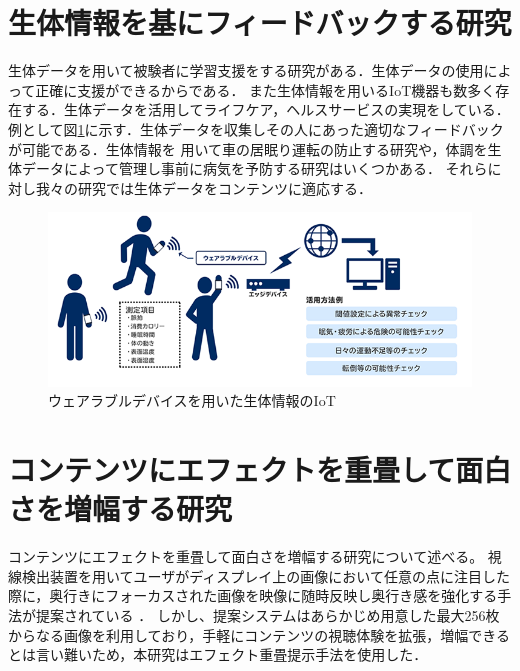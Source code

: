 \section{生体情報を基にフィードバックする研究}

生体データを用いて被験者に学習支援をする研究がある\cite{seitai1,seitai2,seitai3}．生体データの使用によって正確に支援ができるからである．
また生体情報を用いるIoT機器も数多く存在する．生体データを活用してライフケア，ヘルスサービスの実現をしている．
例として図\ref{iot}に示す．生体データを収集しその人にあった適切なフィードバックが可能である．生体情報を
用いて車の居眠り運転の防止する研究\cite{unten}や，体調を生体データによって管理し事前に病気を予防する研究\cite{kibun,yobou,yobou2}はいくつかある．
それらに対し我々の研究では生体データをコンテンツに適応する．

\begin{figure}[H]
    \centering
    \includegraphics[width=15cm]{images/chapter2/body_img02.png}
    \caption{ウェアラブルデバイスを用いた生体情報のIoT\cite{nec}}
    \label{iot}
\end{figure}


\section{コンテンツにエフェクトを重畳して面白さを増幅する研究}
コンテンツにエフェクトを重畳して面白さを増幅する研究について述べる。
視線検出装置を用いてユーザがディスプレイ上の画像において任意の点に注目した際に，奥行きにフォーカスされた画像を映像に随時反映し奥行き感を強化する手法が提案されている\cite{shamo1}\cite{shamo2} ．
しかし、提案システムはあらかじめ用意した最大256枚からなる画像を利用しており，手軽にコンテンツの視聴体験を拡張，増幅できるとは言い難いため\cite{shamo3}，本研究はエフェクト重畳提示手法を使用した． 

